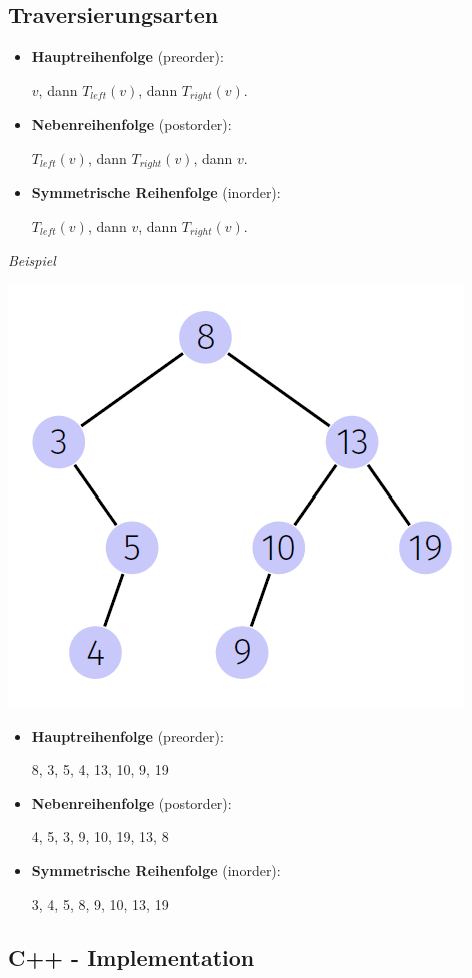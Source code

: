   \begin{sectionbox}
  \subsection{Traversierungsarten}\smallskip
  \begin{greenbox}
  \begin{itemize}
      \item \textbf{Hauptreihenfolge} (preorder):
      \par $v$, dann $T_{left}(v)$, dann $T_{right}(v)$.
      \item \textbf{Nebenreihenfolge} (postorder):
      \par $T_{left}(v)$, dann $T_{right}(v)$, dann $v$.
      \item \textbf{Symmetrische Reihenfolge} (inorder):
      \par $T_{left}(v)$, dann $v$, dann $T_{right}(v)$.
  \end{itemize}
  \end{greenbox}\smallskip
  
  \textit{Beispiel}\par
  \includegraphics[width = 0.4\columnwidth]{../img/BspBST.png}
  \smallskip
  \begin{itemize}
      \item \textbf{Hauptreihenfolge} (preorder):
      \par 8, 3, 5, 4, 13, 10, 9, 19
      \item \textbf{Nebenreihenfolge} (postorder):
      \par 4, 5, 3, 9, 10, 19, 13, 8
      \item \textbf{Symmetrische Reihenfolge} (inorder):
      \par 3, 4, 5, 8, 9, 10, 13, 19
  \end{itemize}
\end{sectionbox}


\subsection{C++ - Implementation}\smallskip
